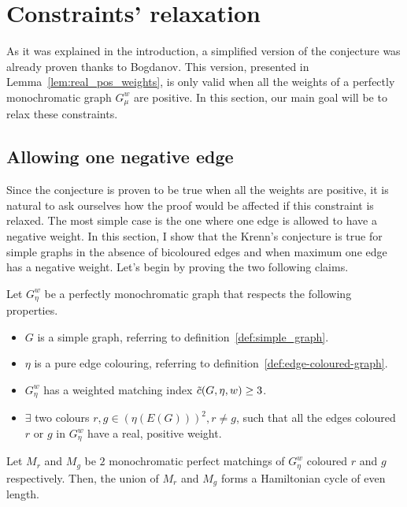 \section{Constraints' relaxation}
\label{sec:constraints-relaxation}

As it was explained in the introduction, a simplified version of the conjecture was already proven thanks to Bogdanov.\cite{bogdanov}
This version, presented in Lemma~\ref{lem:real_pos_weights}, is only valid when all the weights of a perfectly monochromatic graph $G_\mu^w$ are positive.
In this section, our main goal will be to relax these constraints.

\subsection{Allowing one negative edge}
\label{subsec:one_negative_edge}

Since the conjecture is proven to be true when all the weights are positive, it is natural to ask ourselves how the proof would be affected if this constraint is relaxed.
The most simple case is the one where one edge is allowed to have a negative weight.
In this section, I show that the Krenn's conjecture is true for simple graphs in the absence of bicoloured edges and when maximum one edge has a negative weight.
Let's begin by proving the two following claims.

\begin{claim}
    \label{clm:2_positive_classes_ham_cycle}
    Let $G_\eta^w$ be a perfectly monochromatic graph that respects the following properties.
    \begin{itemize}
        \item $G$ is a simple graph, referring to definition~\ref{def:simple_graph}.
        \item $\eta$ is a pure edge colouring, referring to definition~\ref{def:edge-coloured-graph}.
        \item $G_\eta^w$ has a weighted matching index $\Tilde{c}(G, \eta, w) \geq 3$.
        \item $\exists$ two colours $r, g \in \left(\eta(E(G))\right)^2, r \neq g$, such that all the edges coloured $r$ or $g$ in $G_\eta^w$ have a real, positive weight.
    \end{itemize}

    Let $M_r$ and $M_g$ be $2$ monochromatic perfect matchings of $G_\eta^w$ coloured $r$ and $g$ respectively.
    Then, the union of $M_r$ and $M_g$ forms a Hamiltonian cycle of even length.
\end{claim}

